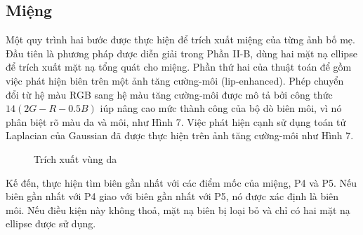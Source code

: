 \documentclass[conference]{IEEEtran}
\begin{document}
\subsection{Miệng}
Một quy trình hai bước được thực hiện để trích xuất miệng của từng ảnh bố mẹ. Đầu tiên là phương pháp được diễn giải trong Phần II-B, dùng hai mặt nạ ellipse để trích xuất mặt nạ tổng quát cho miệng. Phần thứ hai của thuật toán để gồm việc phát hiện biên trên một ảnh tăng cường-môi (lip-enhanced). Phép chuyển đổi từ hệ màu RGB sang hệ màu tăng cường-môi được mô tả bởi công thức $14(2G-R-0.5B)$ iúp nâng cao mức thành công của bộ dò biên môi, vì nó phân biệt rõ màu da và môi, như Hình 7. Việc phát hiện cạnh sử dụng toán tử Laplacian của Gaussian đã được thực hiện trên ảnh tăng cường-môi như Hình 7.

\begin{figure}[!t]
\centering
{}
\caption{Trích xuất vùng da}
\label{refhinh8}
\end{figure}

Kế đến, thực hiện tìm biên gần nhất với các điểm mốc của miệng, P4 và P5. Nếu biên gần nhất với P4 giao với biên gần nhất với P5, nó được xác định là biên môi. Nếu điều kiện này không thoả, mặt nạ biên bị loại bỏ và chỉ có hai mặt nạ ellipse được sử dụng.
\end{document}
